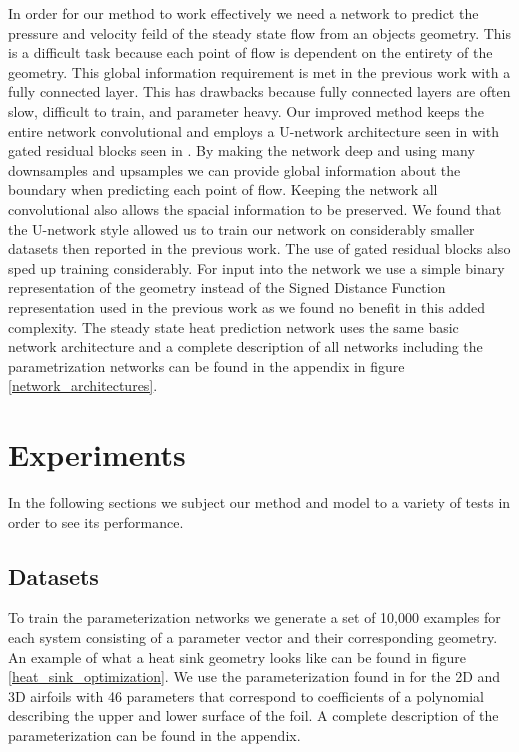 \documentclass{article} %
\begin{document}
In order for our method to work effectively we need a network to predict the pressure and velocity feild of the steady state flow from an objects geometry. This is a difficult task because each point of flow is dependent on the entirety of the geometry. This global information requirement is met in the previous work \citep{guo2016convolutional} with a fully connected layer. This has drawbacks because fully connected layers are often slow, difficult to train, and parameter heavy. Our improved method keeps the entire network convolutional and employs a U-network architecture seen in \citep{DBLP:journals/corr/RonnebergerFB15} with gated residual blocks seen in \citep{salimans2017pixelcnn++}. By making the network deep and using many downsamples and upsamples we can provide global information about the boundary when predicting each point of flow. Keeping the network all convolutional also allows the spacial information to be preserved. We found that the U-network style allowed us to train our network on considerably smaller datasets then reported in the previous work. The use of gated residual blocks also sped up training considerably. For input into the network we use a simple binary representation of the geometry instead of the Signed Distance Function representation used in the previous work as we found no benefit in this added complexity. The steady state heat prediction network uses the same basic network architecture and a complete description of all networks including the parametrization networks can be found in the appendix in figure \ref{network_architectures}.

\section{Experiments}

In the following sections we subject our method and model to a variety of tests in order to see its performance.

\subsection{Datasets}

To train the parameterization networks we generate a set of 10,000 examples for each system consisting of a parameter vector and their corresponding geometry. An example of what a heat sink geometry looks like can be found in figure \ref{heat_sink_optimization}. We use the parameterization found in \cite{lane2009surface} for the 2D and 3D airfoils with 46 parameters that correspond to coefficients of a polynomial describing the upper and lower surface of the foil. A complete description of the parameterization can be found in the appendix.
\end{document}
